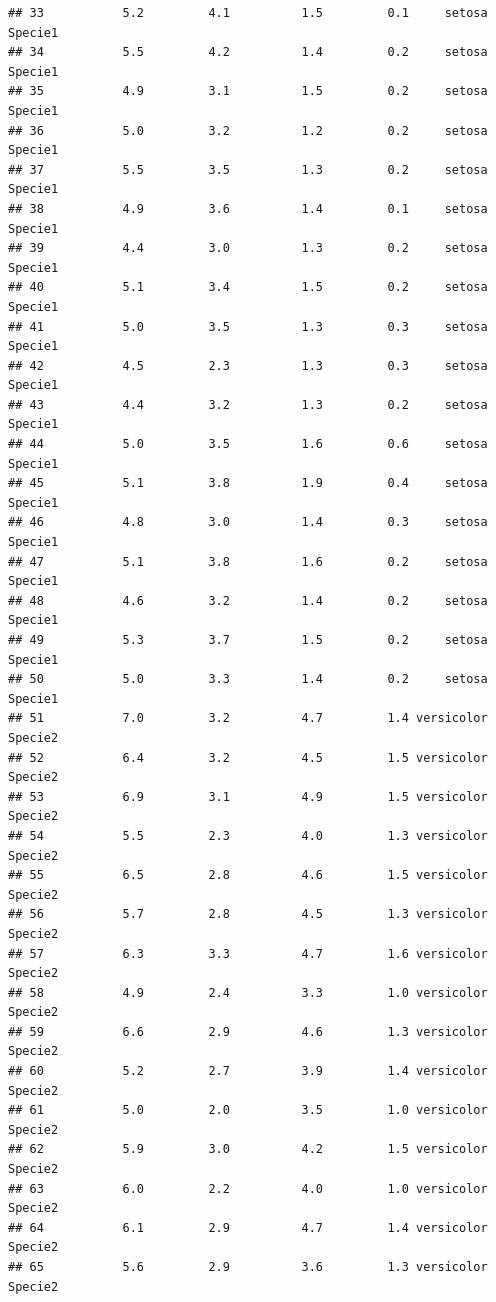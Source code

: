 \documentclass[
]{book}
\begin{document}
\begin{verbatim}
## 33           5.2         4.1          1.5         0.1     setosa    Specie1
## 34           5.5         4.2          1.4         0.2     setosa    Specie1
## 35           4.9         3.1          1.5         0.2     setosa    Specie1
## 36           5.0         3.2          1.2         0.2     setosa    Specie1
## 37           5.5         3.5          1.3         0.2     setosa    Specie1
## 38           4.9         3.6          1.4         0.1     setosa    Specie1
## 39           4.4         3.0          1.3         0.2     setosa    Specie1
## 40           5.1         3.4          1.5         0.2     setosa    Specie1
## 41           5.0         3.5          1.3         0.3     setosa    Specie1
## 42           4.5         2.3          1.3         0.3     setosa    Specie1
## 43           4.4         3.2          1.3         0.2     setosa    Specie1
## 44           5.0         3.5          1.6         0.6     setosa    Specie1
## 45           5.1         3.8          1.9         0.4     setosa    Specie1
## 46           4.8         3.0          1.4         0.3     setosa    Specie1
## 47           5.1         3.8          1.6         0.2     setosa    Specie1
## 48           4.6         3.2          1.4         0.2     setosa    Specie1
## 49           5.3         3.7          1.5         0.2     setosa    Specie1
## 50           5.0         3.3          1.4         0.2     setosa    Specie1
## 51           7.0         3.2          4.7         1.4 versicolor    Specie2
## 52           6.4         3.2          4.5         1.5 versicolor    Specie2
## 53           6.9         3.1          4.9         1.5 versicolor    Specie2
## 54           5.5         2.3          4.0         1.3 versicolor    Specie2
## 55           6.5         2.8          4.6         1.5 versicolor    Specie2
## 56           5.7         2.8          4.5         1.3 versicolor    Specie2
## 57           6.3         3.3          4.7         1.6 versicolor    Specie2
## 58           4.9         2.4          3.3         1.0 versicolor    Specie2
## 59           6.6         2.9          4.6         1.3 versicolor    Specie2
## 60           5.2         2.7          3.9         1.4 versicolor    Specie2
## 61           5.0         2.0          3.5         1.0 versicolor    Specie2
## 62           5.9         3.0          4.2         1.5 versicolor    Specie2
## 63           6.0         2.2          4.0         1.0 versicolor    Specie2
## 64           6.1         2.9          4.7         1.4 versicolor    Specie2
## 65           5.6         2.9          3.6         1.3 versicolor    Specie2

\end{verbatim}
\end{document}
